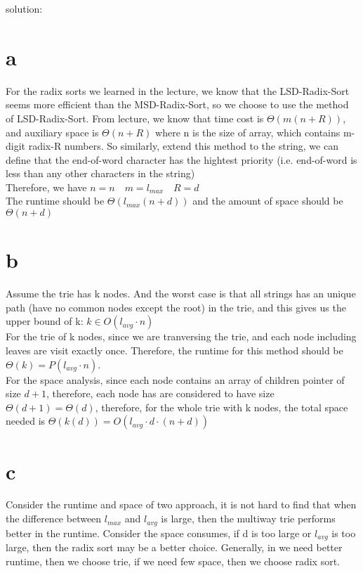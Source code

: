 \documentclass[12pt]{article}
\begin{document}
	
	solution:
	\begin{enumerate}
		\part{a} For the radix sorts we learned in the lecture, we know that the LSD-Radix-Sort seems more efficient than the MSD-Radix-Sort, so we choose to use the method of LSD-Radix-Sort. From lecture, we know that time cost is $\Theta(m(n+R))$, and auxiliary space is $\Theta(n+R)$ where n is the size of array, which contains  m-digit radix-R numbers. So similarly, extend this method to the string, we can define that the end-of-word character has the hightest priority (i.e. end-of-word is less than any other characters in the string)\\ Therefore, we have $n=n \quad m=l_{max} \quad R=d$\\
		The runtime should be $\Theta(l_{max}(n+d))$ and the amount of space should be $\Theta(n+d)$
		
		\part{b} Assume the trie has k nodes. And the worst case is that all strings has an unique path (have no common nodes except the root) in the trie, and this gives us the upper bound of k: $ k \in O(l_{avg} \cdot n)$\\
		For the trie of k nodes, since we are tranversing the trie, and each node including leaves are visit exactly once. Therefore, the runtime for this method should be $\Theta(k) = P(l_{avg} \cdot n)$.\\
		For the space analysis, since each node contains an array of children pointer of size $d+1$, therefore, each node has are considered to have size $\Theta(d+1) = \Theta(d)$, therefore, for the whole trie with k nodes, the total space needed is $\Theta(k(d)) = O(l_{avg}\cdot d \cdot  (n+d))$ 
		
		\part{c} Consider the runtime and space of two approach, it is not hard to find that when the difference between $l_{max}$ and $l_{avg}$ is large, then the multiway trie performs better in the runtime. Consider the space consumes, if d is too large or $l_{avg}$ is too large, then the radix sort may be a better choice. Generally, in we need better runtime, then we choose trie, if we need few space, then we choose radix sort.
	\end{enumerate}
	
\end{document}
